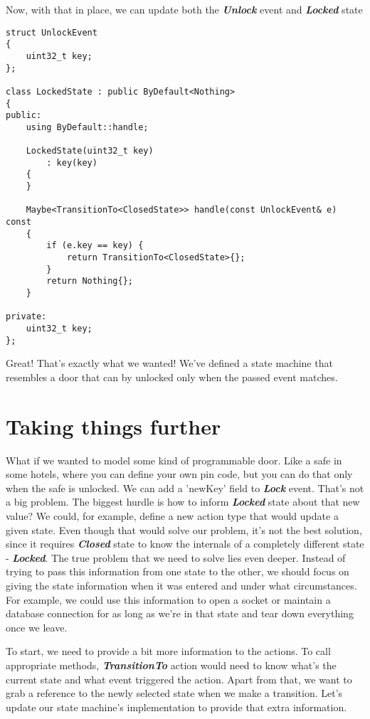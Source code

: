\documentclass{article}[8pt]
\newcommand{\code}[1]{\textbf{\textit{#1}}}
\newcommand{\closed}{\code{Closed}}
\newcommand{\locked}{\code{Locked}}
\newcommand{\lock}{\code{Lock}}
\newcommand{\unlock}{\code{Unlock}}
\begin{document}
Now, with that in place, we can update both the \unlock{} event and \locked{} state

\bigskip
\begin{verbatim}
struct UnlockEvent
{
	uint32_t key;
};

class LockedState : public ByDefault<Nothing>
{
public:
	using ByDefault::handle;

	LockedState(uint32_t key)
		: key(key)
	{
	}

	Maybe<TransitionTo<ClosedState>> handle(const UnlockEvent& e) const
    {
        if (e.key == key) {
            return TransitionTo<ClosedState>{};
        }
        return Nothing{};
    }

private:
    uint32_t key;
};
\end{verbatim}
\bigskip

Great! That's exactly what we wanted! We've defined a state machine that resembles a door that can by unlocked only when the passed event matches.

\section*{Taking things further}

What if we wanted to model some kind of programmable door. Like a safe in some hotels, where you can define your own pin code, but you can do that only when the safe is unlocked. We can add a 'newKey' field to \lock{} event. That's not a big problem. The biggest hurdle is how to inform \locked{} state about that new value? We could, for example, define a new action type that would update a given state. Even though that would solve our problem, it's not the best solution, since it requires \closed{} state to know the internals of a completely different state - \locked{}. The true problem that we need to solve lies even deeper. Instead of trying to pass this information from one state to the other, we should focus on giving the state information when it was entered and under what circumstances. For example, we could use this information to open a socket or maintain a database connection for as long as we're in that state and tear down everything once we leave.

To start, we need to provide a bit more information to the actions. To call appropriate methods, \code{TransitionTo} action would need to know what's the current state and what event triggered the action. Apart from that, we want to grab a reference to the newly selected state when we make a transition. Let's update our state machine's implementation to provide that extra information.
\end{document}
